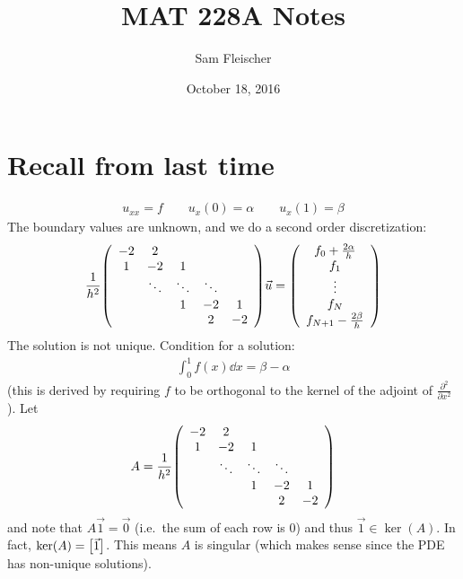 \documentclass{article}
\title{MAT 228A Notes}
\author{Sam Fleischer}
\date{October 18, 2016}
\begin{document}
    \maketitle

    \section{Recall from last time}
        \begin{align}
            u_{xx} = f \qquad u_x(0) = \alpha \qquad u_x(1) = \beta
        \end{align}
        The boundary values are unknown, and we do a second order discretization:
        \begin{align}
            \frac{1}{h^2}\qty(\begin{array}{ccccc}
                        -2 & 2 & & & \\
                        1 & -2 & 1 & & \\
                        & \ddots & \ddots & \ddots &  \\
                        & & 1 & -2 & 1 \\
                        & & & 2 & -2
                    \end{array})\vec{u} = \qty(\begin{array}{c}
                        f_0 + \frac{2\alpha}{h} \\ f_1 \\ \vdots \\ f_N \\ f_{N+1} - \frac{2\beta}{h}
                    \end{array})
        \end{align}
        The solution is not unique.  Condition for a solution:
        \begin{align}
            \int_0^1 f(x) \dd x = \beta - \alpha
        \end{align}
        (this is derived by requiring $f$ to be orthogonal to the kernel of the adjoint of $\frac{\partial^2}{\partial x^2}$).
        Let
        \begin{align}
            A = \frac{1}{h^2}\qty(\begin{array}{ccccc}
                    -2 & 2 & & & \\
                    1 & -2 & 1 & & \\
                    & \ddots & \ddots & \ddots &  \\
                    & & 1 & -2 & 1 \\
                    & & & 2 & -2
                \end{array})
        \end{align}
        and note that $A\vec{1} = \vec{0}$ (i.e.~the sum of each row is $0$) and thus $\vec{1} \in \ker(A)$.  In fact, $\ker(A) = \qty[\vec{1}]$.  This means $A$ is singular (which makes sense since the PDE has non-unique solutions).
\end{document}
